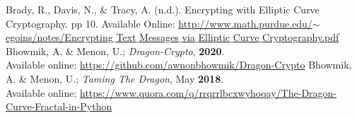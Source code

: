 \documentclass[cryptography,article,submit,moreauthors,pdftex]{Definitions/mdpi}
\begin{document}
\begin{thebibliography}{999}
Brady, R., Davis, N., \& Tracy, A. (n.d.). Encrypting with Elliptic Curve Cryptography. pp 10. Available Online: \href{https://www.math.purdue.edu/~egoins/notes/Encrypting_Text_Messages_via_Elliptic_Curve_Cryptography.pdf}{\footnotesize{http://www.math.purdue.edu/$\sim$egoins/notes/Encrypting$\_$Text$\_$Messages$\_$via$\_$Elliptic$\_$Curve$\_$Cryptography.pdf}}
 Bhowmik, A. \& Menon, U.; \textit{Dragon-Crypto}, {\textbf{2020}}. \\Available online: \href{https://github.com/awnonbhowmik/Dragon-Crypto}{https://github.com/awnonbhowmik/Dragon-Crypto}
 Bhowmik, A. \& Menon, U.; \textit{Taming The Dragon}, {May \textbf{2018}}. \\Available online: \href{https://www.quora.com/q/rrqrrlbcxwyhoqay/The-Dragon-Curve-Fractal-in-Python}{https://www.quora.com/q/rrqrrlbcxwyhoqay/The-Dragon-Curve-Fractal-in-Python}
\end{thebibliography}


%



\end{document}
